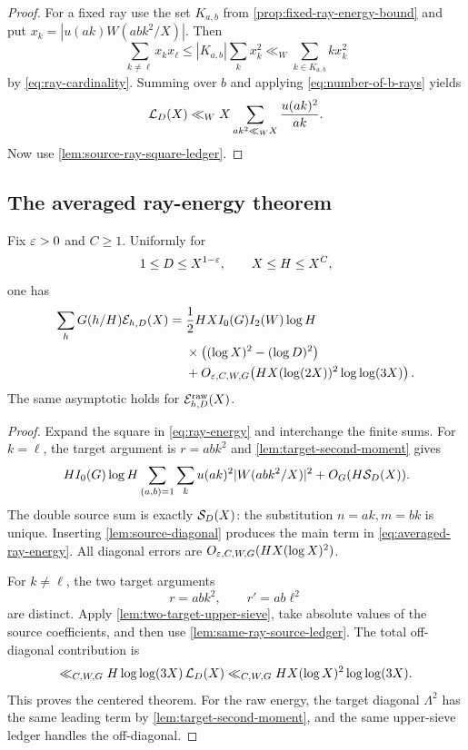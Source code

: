 \begin{proof}
For a fixed ray use the set $K_{a,b}$ from
\cref{prop:fixed-ray-energy-bound} and put
$x_k=|u(ak)W(abk^2/X)|$.  Then
\[
 \sum_{k\ne\ell}x_kx_\ell
 \leq |K_{a,b}|\sum_kx_k^2
 \ll_W\sum_{k\in K_{a,b}}k x_k^2
\]
by \eqref{eq:ray-cardinality}.  Summing over $b$ and applying
\eqref{eq:number-of-b-rays} yields
\[
 \mathcal L_D(X)
 \ll_W X\sum_{ak^2\ll_W X}\frac{u(ak)^2}{ak}.
\]
Now use \cref{lem:source-ray-square-ledger}.
\end{proof}

\subsection{The averaged ray-energy theorem}

\begin{theorem}
\label{thm:averaged-ray-energy}
Fix $\varepsilon>0$ and $C\geq1$.  Uniformly for
\[
 1\leq D\leq X^{1-\varepsilon},
 \qquad X\leq H\leq X^C,
\]
one has
\begin{equation}
 \begin{aligned}
 \sum_hG(h/H)\mathcal E_{h,D}(X)
 ={}&\frac12HX I_0(G)I_2(W)\log H\\
 &\times\bigl((\log X)^2-(\log D)^2\bigr)\\
 &+O_{\varepsilon,C,W,G}\!\left(
 HX(\log(2X))^2\log\log(3X)\right).
 \end{aligned}
 \label{eq:averaged-ray-energy}
\end{equation}
The same asymptotic holds for $\mathcal E^{\mathrm{raw}}_{h,D}(X)$.
\end{theorem}

\begin{proof}
Expand the square in \eqref{eq:ray-energy} and interchange the finite
sums.  For $k=\ell$, the target argument is $r=abk^2$ and
\cref{lem:target-second-moment} gives
\[
 H I_0(G)\log H\sum_{(a,b)=1}\sum_k
 u(ak)^2|W(abk^2/X)|^2+O_G(H\mathcal S_D(X)).
\]
The double source sum is exactly $\mathcal S_D(X)$: the substitution
$n=ak,m=bk$ is unique.  Inserting \cref{lem:source-diagonal} produces the
main term in \eqref{eq:averaged-ray-energy}.  All diagonal errors are
$O_{\varepsilon,C,W,G}(HX(\log X)^2)$.

For $k\ne\ell$, the two target arguments
\[
 r=abk^2,
 \qquad r'=ab\ell^2
\]
are distinct.  Apply \cref{lem:two-target-upper-sieve}, take absolute
values of the source coefficients, and then use
\cref{lem:same-ray-source-ledger}.  The total off-diagonal contribution is
\[
 \ll_{C,W,G}H\log\log(3X)\,\mathcal L_D(X)
 \ll_{C,W,G}HX(\log X)^2\log\log(3X).
\]
This proves the centered theorem.  For the raw energy, the target
diagonal $\Lambda^2$ has the same leading term by
\cref{lem:target-second-moment}, and the same upper-sieve ledger handles
the off-diagonal.
\end{proof}

